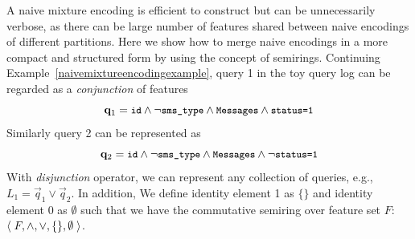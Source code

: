  A naive mixture encoding is efficient to construct but can be unnecessarily verbose, as there can be large number of features shared between naive encodings of different partitions.
 Here we show how to merge naive encodings in a more compact and structured form by using the concept of semirings.
 Continuing Example~\ref{naivemixtureencodingexample}, query 1 in the toy query log can be regarded as a \textit{conjunction} of features 
 $$\vec q_1=\texttt{\small id}\land
  \neg \texttt{\small sms\_type}\land
  \texttt{\small Messages}\land
  \texttt{\small status=1}$$
 Similarly query 2 can be represented as 
 $$\vec q_2=\texttt{\small id}\land
  \neg \texttt{\small sms\_type}\land
  \texttt{\small Messages}\land
  \neg \texttt{\small status=1}$$
 With \textit{disjunction} operator, we can represent any collection of queries, e.g., $L_1=\vec q_1\lor\vec q_2$.
 In addition, We define identity element 1 as $\{\}$ and identity element 0 as $\emptyset$ such that we have the commutative semiring over feature set $F$: $\tuple{F,\land,\lor,\{\},\emptyset}$.

